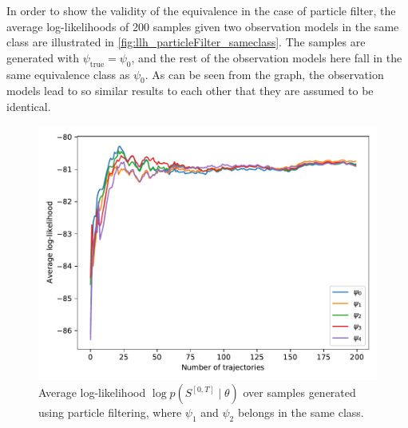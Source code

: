 In order to show the validity of the equivalence in the case of particle filter, the average log-likelihoods of 200 samples given two observation models in the same class are illustrated in \autoref{fig:llh_particleFilter_sameclass}. The samples are generated with $ \psi_{\text{true}} = \psi_{0} $, and the rest of the observation models here fall in the same equivalence class as $ \psi_0 $. As can be seen from the graph, the observation models lead to so similar results to each other that they are assumed to be identical. 
\begin{figure}[H]
	\begin{center}
		\includegraphics[width=.8\textwidth]{figures/equivalence_classes/llh_particleFilter_sameclass}
		\caption[An equivalence class in the case of particle filtering]{Average log-likelihood $ \log p(S^{[0,T]} \mid \theta) $ over samples generated using particle filtering, where $ \psi_1 $ and $ \psi_2 $ belongs in the same class.}
		\label{fig:llh_particleFilter_sameclass}
	\end{center}
\end{figure} 
